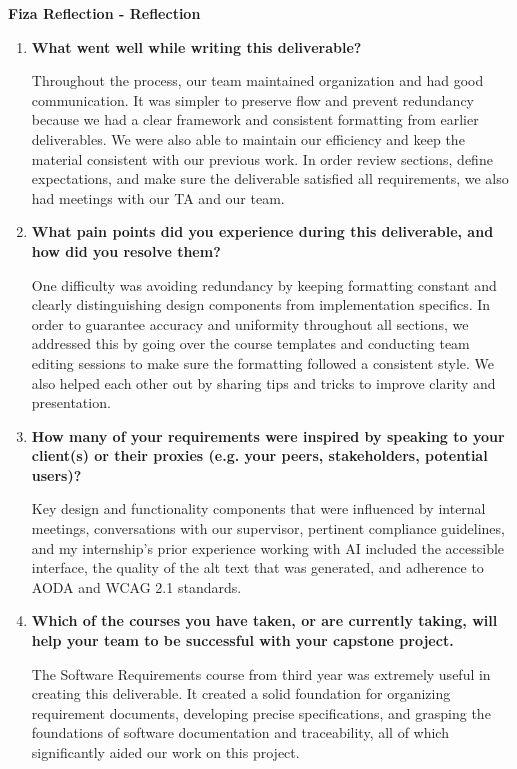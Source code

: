 \textbf{Fiza Reflection  - Reflection}
\begin{enumerate}
  \item \textbf{What went well while writing this deliverable?} \newline
  
  Throughout the process, our team maintained organization and had good communication.  It was simpler to preserve flow and prevent redundancy because we had a clear framework and consistent formatting from earlier deliverables.  We were also able to maintain our efficiency and keep the material consistent with our previous work.  In order review sections, define expectations, and make sure the deliverable satisfied all requirements, we also had meetings with our TA and our team.
 \item \textbf{What pain points did you experience during this
    deliverable, and how did you resolve them?} \newline

  One difficulty was avoiding redundancy by keeping formatting constant and clearly distinguishing design components from implementation specifics. In order to guarantee accuracy and uniformity throughout all sections, we addressed this by going over the course templates and conducting team editing sessions to make sure the formatting followed a consistent style. We also helped each other out by sharing tips and tricks to improve clarity and presentation.

  \item \textbf{How many of your requirements were inspired by speaking to your
  client(s) or their proxies (e.g. your peers, stakeholders, potential users)?}
  
  Key design and functionality components that were influenced by internal meetings, conversations with our supervisor, pertinent compliance guidelines, and my internship's prior experience working with AI included the accessible interface, the quality of the alt text that was generated, and adherence to AODA and WCAG 2.1 standards.
  \item\textbf{Which of the courses you have taken, or are currently taking, will help
  your team to be successful with your capstone project.}

  The Software Requirements course from third year was extremely useful in creating this deliverable.  It created a solid foundation for organizing requirement documents, developing precise specifications, and grasping the foundations of software documentation and traceability, all of which significantly aided our work on this project.
\end{enumerate}


